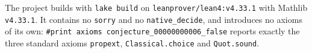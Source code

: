 \documentclass[11pt]{article}
\theoremstyle{plain}
\theoremstyle{definition}
\theoremstyle{remark}
\begin{document}
The project builds with \texttt{lake build} on
\texttt{leanprover/lean4:v4.33.1} with Mathlib \texttt{v4.33.1}. It contains
no \texttt{sorry} and no \texttt{native\_decide}, and introduces no axioms of
its own: \texttt{\#print axioms conjecture\_00000000006\_false} reports exactly
the three standard axioms \texttt{propext}, \texttt{Classical.choice} and
\texttt{Quot.sound}.
\end{document}
